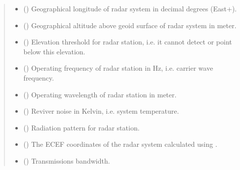 \documentclass[letterpaper,10pt,english]{sphinxmanual}
\begin{document}
\begin{fulllineitems}
\begin{quote}
\begin{description}
\begin{itemize}
\item {} 
 () \textendash{} Geographical longitude of radar system in decimal degrees (East+).

\item {} 
 () \textendash{} Geographical altitude above geoid surface of radar system in meter.

\item {} 
 () \textendash{} Elevation threshold for radar station, i.e. it cannot detect or point below this elevation.

\item {} 
 () \textendash{} Operating frequency of radar station in Hz, i.e. carrier wave frequency.

\item {} 
 () \textendash{} Operating wavelength of radar station in meter.

\item {} 
 () \textendash{} Reviver noise in Kelvin, i.e. system temperature.

\item {} 
 ({\hyperref[\detokenize{modules/antenna:antenna.BeamPattern}]{}}) \textendash{} Radiation pattern for radar station.

\item {} 
 () \textendash{} The ECEF coordinates of the radar system calculated using {\hyperref[\detokenize{modules/coord:coord.geodetic2ecef}]{}}.

\item {} 
 () \textendash{} Transmissions bandwidth.


\end{itemize}
\end{description}
\end{quote}
\end{fulllineitems}
\end{document}
